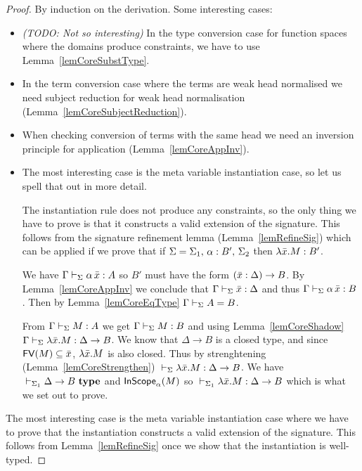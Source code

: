 \begin{proof}
    By induction on the derivation.
\if {}
    Some interesting cases:
    \begin{itemize}

	\item {\em (TODO: Not so interesting)} In the type conversion case for
	function spaces where the domains produce constraints, we have to use
	Lemma~\ref{lemCoreSubstType}.

	\item In the term conversion case where the terms are weak head
	normalised we need subject reduction for weak head normalisation
	(Lemma~\ref{lemCoreSubjectReduction}).

	\item When checking conversion of terms with the same head we need an
	inversion principle for application (Lemma~\ref{lemCoreAppInv}).

	\item The most interesting case is the meta variable instantiation
	case, so let us spell that out in more detail.

	The instantiation rule does not produce any constraints, so the only
	thing we have to prove is that it constructs a valid extension of the
	signature. This follows from the signature refinement lemma
	(Lemma~\ref{lemRefineSig}) which can be applied if we prove that if
	$\Sigma = {\Sigma_1},\,{} {{\alpha} : {B'}},\,{} \Sigma_2$ then
	$\lambda \bar x.{} M : {B'}$.

	We have ${\Gamma} \vdash_{\Sigma} {\alpha \, \bar x} : {A}$ so $B'$ must
	have the form $(\bar x:\Delta)\to{} B$. By Lemma~\ref{lemCoreAppInv} we
	conclude that ${\Gamma} \vdash_{\Sigma} {\bar x} : {\Delta}$ and thus
	${\Gamma} \vdash_{\Sigma} {\alpha \, \bar x} : {B}$. Then by
	Lemma~\ref{lemCoreEqType} ${\Gamma} \vdash_{\Sigma}A=B$.

	From ${\Gamma} \vdash_{\Sigma} {M} : {A}$ we get ${\Gamma} \vdash_{\Sigma} {M} : {B}$ and using Lemma~\ref{lemCoreShadow}  ${\Gamma} \vdash_{\Sigma} {\lambda \bar x.{} M} : {\Delta \to B}$. We know that $\Delta \to B$ is a closed
	type, and since $\mathsf{FV}({M}) \subseteq \bar x$, $\lambda \bar x.{} M$ is also
	closed. Thus by strenghtening (Lemma~\ref{lemCoreStrengthen})
	${} \vdash_{\Sigma} {\lambda \bar x.{} M} : {\Delta \to B}$. We have
	${} \vdash_{\Sigma_1}\Delta \to B ~ \mathbf{type}$ and $\mathsf{InScope}_{\alpha}({M})$ so
	${} \vdash_{\Sigma_1} {\lambda \bar x.{} M} : {\Delta \to B}$ which is
	what we set out to prove.

    \end{itemize}
\else
    The most interesting case is the meta variable instantiation case where we
    have to prove that the instantiation constructs a valid extension of the
    signature. This follows from Lemma~\ref{lemRefineSig} once we show that
    the instantiation is well-typed.
\fi
\end{proof}

